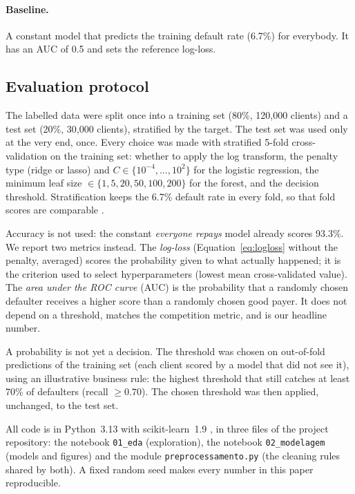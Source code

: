 \paragraph{Baseline.} A constant model that predicts the training default rate
(6.7\%) for everybody. It has an AUC of 0.5 and sets the reference log-loss.

\subsection{Evaluation protocol}
\label{sec:evaluation}
The labelled data were split once into a training set (80\%, 120{,}000
clients) and a test set (20\%, 30{,}000 clients), stratified by the target.
The test set was used only at the very end, once. Every choice was made with
stratified 5-fold cross-validation on the training set: whether to apply the
log transform, the penalty type (ridge or lasso) and $C \in \{10^{-4}, \dots,
10^{2}\}$ for the logistic regression, the minimum leaf size
$\in\{1, 5, 20, 50, 100, 200\}$ for the forest, and the decision threshold.
Stratification keeps the 6.7\% default rate in every fold, so that fold scores
are comparable \citep{oku2026slides}.

Accuracy is not used: the constant \emph{everyone repays} model already scores
93.3\%. We report two metrics instead. The \emph{log-loss}
(Equation~\ref{eq:logloss} without the penalty, averaged) scores the
probability given to what actually happened; it is the criterion used to
select hyperparameters (lowest mean cross-validated value). The \emph{area
under the ROC curve} (AUC) is the probability that a randomly chosen defaulter
receives a higher score than a randomly chosen good payer. It does not depend
on a threshold, matches the competition metric, and is our headline number.

A probability is not yet a decision. The threshold was chosen on out-of-fold
predictions of the training set (each client scored by a model that did not
see it), using an illustrative business rule: the highest threshold that still
catches at least 70\% of defaulters (recall $\geq 0.70$). The chosen threshold
was then applied, unchanged, to the test set.

All code is in Python~3.13 with scikit-learn~1.9 \citep{pedregosa2011scikit},
in three files of the project repository: the notebook \texttt{01\_eda}
(exploration), the notebook \texttt{02\_modelagem} (models and figures) and
the module \texttt{preprocessamento.py} (the cleaning rules shared by both). A
fixed random seed makes every number in this paper reproducible.
